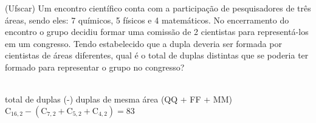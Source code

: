 \begin{ex}
(Ufscar) Um encontro científico conta com a participação de pesquisadores de três áreas, sendo eles: 7 químicos, 5 físicos e 4 matemáticos. No encerramento do encontro o grupo decidiu formar uma comissão de 2 cientistas para representá-los em um congresso. Tendo estabelecido que a dupla deveria ser formada por cientistas de áreas diferentes, qual é o total de duplas distintas que se poderia ter formado para representar o grupo no congresso?
  \begin{sol}
    \phantom{A} \\
    total de duplas (-) duplas de mesma área (QQ + FF + MM) \\
    $\mathrm{C}_{{16},2}-(\mathrm{C}_{7,2}+\mathrm{C}_{5,2}+\mathrm{C}_{4,2})=83$
  \end{sol}
\end{ex}
